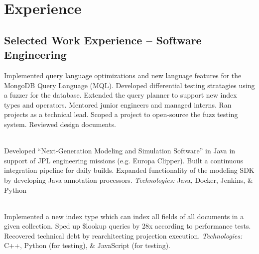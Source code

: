 \documentclass[11pt,letter,sans]{moderncv}
\newcommand{\dingbat}{\color{color1}{\large\photon}}
\begin{document}
\section{Experience}
\subsection{\textbf{Selected Work Experience -- Software Engineering}}

Implemented query {\color{color1}language optimizations} and {\color{color1}new language features} for the MongoDB Query Language (MQL).
Developed {\color{color1}differential testing} stratagies using a fuzzer for the database.
Extended the {\color{color1}query planner} to support new index types and operators.
Mentored junior engineers and managed interns.
Ran projects as a {\color{color1}technical lead}.
Scoped a project to {\color{color1}open-source} the fuzz testing system.
Reviewed design documents.\\
\centerline{\dingbat}
\\
Developed ``Next-Generation Modeling and Simulation Software'' in Java in support of JPL engineering missions (e.g. Europa Clipper). Built a {\color{color1}continuous integration} pipeline for daily builds.
Expanded functionality of the {\color{color1}modeling SDK} by developing Java annotation processors. \textit{Technologies:} Java, Docker, Jenkins, \& Python
\\
\centerline{\dingbat}
\\
Implemented a new index type which can index all fields of all documents in a given collection.
Sped up \$lookup queries by 28x according to performance tests.
Recovered technical debt by rearchitecting projection execution.
\textit{Technologies:} C++, Python (for testing), \& JavaScript (for testing).
\\
\centerline{\dingbat}
\end{document}
